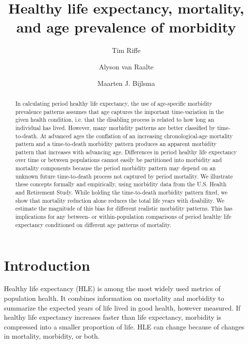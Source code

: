\documentclass[11pt,oneside,a4paper]{article} %
\begin{document}
\title{Healthy life expectancy, mortality, and age prevalence of morbidity}

\author[1]{Tim Riffe}
\author[1]{Alyson van Raalte}
\author[1]{Maarten J. Bijlsma}


\maketitle

\begin{abstract}
In calculating period healthy life expectancy, the use of age-specific morbidity prevalence patterns assumes that age captures the important time-variation in the given health condition, i.e. that the disabling process is related to how long an individual has lived. However, many morbidity patterns are better classified by time-to-death. At advanced ages the conflation of an increasing chronological-age mortality pattern and a time-to-death morbidity pattern produces an apparent morbidity pattern that increases with advancing age. Differences in period healthy life expectancy over time or between populations cannot easily be partitioned into morbidity and mortality components because
the period morbidity pattern may depend on an unknown future time-to-death process not captured by period mortality. We illustrate these concepts formally and empirically, using morbidity data from the U.S. Health and Retirement Study. While holding the time-to-death morbidity pattern fixed, we show that mortality reduction alone reduces the total life years with disability. We estimate the magnitude of this bias for different realistic morbidity patterns. This has implications for any between- or within-population comparisons of period healthy life expectancy conditioned on different age patterns of mortality.
\end{abstract}

\section{Introduction}

Healthy life expectancy (HLE) is among the most widely used metrics of
population health. It combines information on mortality and morbidity to
summarize the expected years of life lived in good health, however measured. If
healthy life expectancy increases faster than life expectancy, morbidity is
compressed into a smaller proportion of life. HLE can change because of changes in mortality, morbidity, or both.
\end{document}
